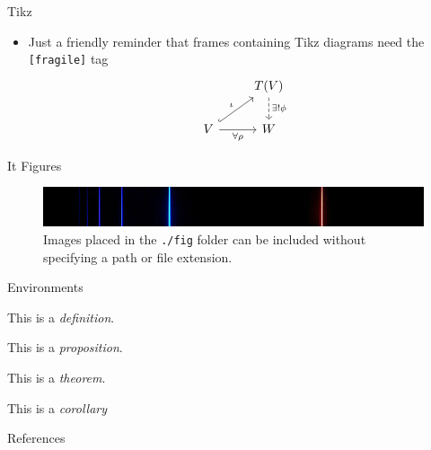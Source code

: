 \documentclass[pdf, fleqn, compress]{beamer}
\newcommand{\mathsterm}[1]{{\itshape\color{dark-teal!80}#1}}
\begin{document}
\begin{frame}[fragile]{Tikz}
	\begin{itemize}
		\item	Just a friendly reminder that frames containing Tikz diagrams need the \texttt{[fragile]} tag
				\begin{equation}
					\begin{tikzcd}
						&
						T(V)
							\ar[d, dashed, "\exists ! \phi"]
						\\
						V
							\ar[ur, hookrightarrow, "\iota"]
							\ar[r, swap, "\forall \rho"]
						&
						W		
					\end{tikzcd}
				\end{equation}
	\end{itemize}
\end{frame}

\begin{frame}{It Figures}
	\begin{figure}
		\centering
			\includegraphics[width=\linewidth]{BalmerVisible}
		\caption{Images placed in the \texttt{./fig} folder can be included without specifying a path or file extension.}
	\end{figure}
\end{frame}

\begin{frame}{Environments}
	\begin{definition}
		This is a \mathsterm{definition}.
	\end{definition}

	\begin{prop}
		This is a \mathsterm{proposition}.
	\end{prop}

	\begin{theorem}
		This is a \mathsterm{theorem}.
	\end{theorem}

	\begin{corollary}
		This is a \mathsterm{corollary}
	\end{corollary}
\end{frame}
\begin{nonavigation}
\appendix

\begin{frame}{References}
	\fontsize{8pt}{7.2}\selectfont
	
	
\end{frame}

\end{nonavigation}
\end{document}
